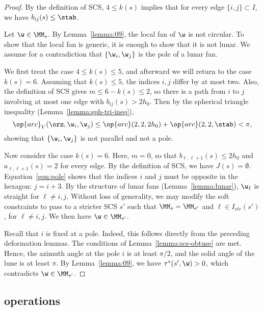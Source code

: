\begin{proof}
By the definition of SCS, $4\le k(s)$ implies
that  for every edge $\{i,j\}\subset I$, we have
$b_{i j}(s) \le\stab$.

Let $\w\in \MM_s$.  By Lemma~\ref{lemma:09}, the local fan of $\w$  is not circular.
To show that the local fan is generic, it is enough to show that it is not lunar.
We assume for a contradiction that $\{\w_i,\w_j\}$ is the pole of a lunar fan.

We first treat the case  $4\le k(s)\le 5$,
and afterward we will return to the case $k(s)=6$. 
Assuming that  $k(s)\le 5$, the indices $i,j$ differ by at most two.
Also, the definition of SCS gives $m\le 6-k(s)\le 2$, so there is a path from
$i$ to $j$ involving at most one edge with $b_{i j}(s)>2h_0$.
Then by the spherical triangle inequality (Lemma~\ref{lemma:sph-tri-ineq}),
\begin{equation}\label{eqn:pole}
\op{arc}_V(\orz,\w_i,\w_j) \le \op{arc}(2,2,2h_0) + \op{arc}(2,2,\stab) < \pi,
\end{equation}
showing that $\{\w_i,\w_j\}$ is not parallel and not a pole.

Now consider the case $k(s)=6$.  Here, $m=0$, so that $b_{\ell,\ell+1}(s)\le 2h_0$
and $a_{\ell,\ell+1}(s)=2$
for every edge. By the definition of SCS, we have $J(s)=\emptyset$.
Equation~\ref{eqn:pole} shows that the indices $i$ and $j$
must be opposite in the hexagon: $j = i+3$.  By the structure of lunar fans
(Lemma~\ref{lemma:lunar}), $\w_\ell$ is straight for $\ell\ne i,j$.  Without
loss of generality, we may
modify the soft constraints to pass to a stricter SCS $s'$ such that
$\MM_s = \MM_{s'}$ and
$\ell\in I_{str}(s')$, for $\ell\ne i,j$.  We then have $\w\in \MM_{s'}$.

Recall that $i$ is fixed at a pole. 
  Indeed, this follows directly from the preceding deformation
lemmas.  The conditions of Lemma~\ref{lemma:scs-obtuse} are met.
Hence, the azimuth angle at the pole $i$ is at least $\pi/2$, and
 the solid angle of the lune is at least $\pi$.  By Lemma~\ref{lemma:09},
we have $\tau^*(s',\w)>0$, which contradicts $\w\in \MM_{s'}$.
\end{proof}


\subsection{operations}

